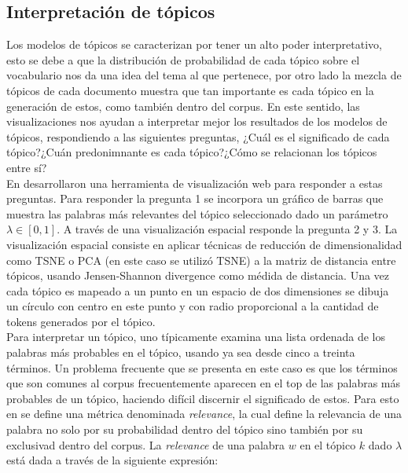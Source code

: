 \documentclass[letterpaper,12pt,oneside]{book} %
\begin{document}
\subsection{Interpretación de tópicos}
Los modelos de tópicos se caracterizan por tener un alto poder interpretativo, esto se debe a que la distribución de probabilidad de cada tópico sobre el vocabulario nos da una idea del tema al que pertenece, por otro lado la mezcla de tópicos de cada documento muestra que tan importante es cada tópico en la generación de estos, como también dentro del corpus. En este sentido, las visualizaciones nos ayudan a interpretar mejor los resultados de los modelos de tópicos, respondiendo a las siguientes preguntas, ¿Cuál es el significado de cada tópico?¿Cuán predonimnante es cada tópico?¿Cómo se relacionan los tópicos entre sí?\\

En \citep{sievert2014ldavis} desarrollaron una herramienta de visualización web para responder a estas preguntas. Para responder la pregunta 1 se incorpora un gráfico de barras que muestra las palabras más relevantes del tópico seleccionado dado un parámetro $\lambda \in [0,1]$. A través de una visualización espacial responde la pregunta 2 y 3. La visualización espacial consiste en aplicar técnicas de reducción de dimensionalidad como TSNE \citep{maaten2008visualizing} o PCA \citep{wold1987principal} (en este caso se utilizó TSNE) a la matriz de distancia entre tópicos, usando Jensen-Shannon divergence \citep{endres2003new} como médida de distancia. Una vez cada tópico es mapeado a un punto en un espacio de dos dimensiones se dibuja un círculo con centro en este punto y con radio proporcional a la cantidad de tokens generados por el tópico.\\

Para interpretar un tópico, uno típicamente examina una lista ordenada de los palabras más probables en el tópico, usando ya sea desde cinco a treinta términos. Un problema frecuente que se presenta en este caso es que los términos que son comunes al corpus frecuentemente aparecen en el top de las palabras más probables de un tópico, haciendo difícil discernir el significado de estos.
Para esto en \citep{sievert2014ldavis} se define una métrica denominada \textit{relevance}, la cual define la relevancia de una palabra no solo por su probabilidad dentro del tópico sino también por su exclusivad dentro del corpus. La \textit{relevance} de una palabra $w$ en el tópico $k$ dado $\lambda$ está dada a través de la siguiente expresión:
\end{document}
